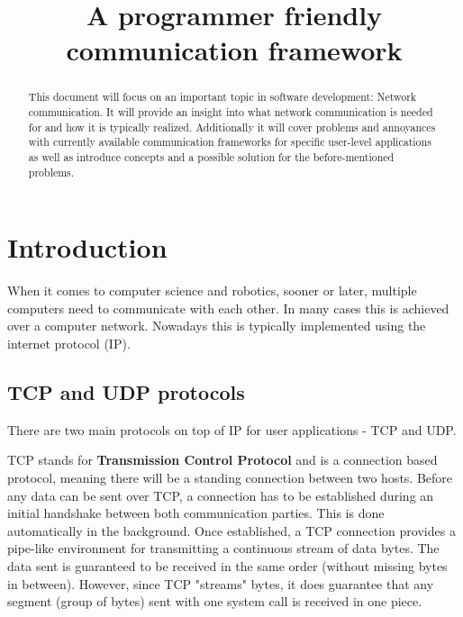\documentclass[conference]{IEEEtran}
\begin{document}
\title{A programmer friendly communication framework}

\author{
    \and
}

\maketitle

\begin{abstract}
    This document will focus on an important topic in software development: Network communication. It will provide an insight into what network communication is needed for and how it is typically realized. Additionally it will cover problems and annoyances with currently available communication frameworks for specific user-level applications as well as introduce concepts and a possible solution for the before-mentioned problems.
\end{abstract}

\section{Introduction}

When it comes to computer science and robotics, sooner or later, multiple computers need to communicate with each other. In many cases this is achieved over a computer network. Nowadays this is typically implemented using the internet protocol (IP).


\subsection{TCP and UDP protocols}

There are two main protocols on top of IP for user applications - TCP and UDP. 

TCP stands for \textbf{Transmission Control Protocol} and is a connection based protocol, meaning there will be a standing connection between two hosts. Before any data can be sent over TCP, a connection has to be established during an initial handshake between both communication parties. This is done automatically in the background. Once established, a TCP connection provides a pipe-like environment for transmitting a continuous stream of data bytes. The data sent is guaranteed to be received in the same order (without missing bytes in between). However, since TCP "streams" bytes, it does guarantee that any segment (group of bytes) sent with one system call is received in one piece.
\end{document}
